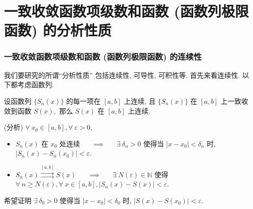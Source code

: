 
\section{一致收敛函数项级数和函数 (函数列极限函数) 的分析性质}


\begin{frame}
\frametitle{一致收敛函数项级数和函数 (函数列极限函数) 的连续性}

我们要研究的所谓``分析性质'' 包括连续性, 可导性, 可积性等. 首先来看连续性. 以下都考虑函数列.

\pause
\vspace{1em}

\begin{thm}[一致收敛函数列极限函数的连续性定理]
设函数列 $\{S_n(x)\}$ 的每一项在 $[a, b]$ 上连续, 且 $\{S_n(x)\}$ 在 $[a, b]$ 上一致收敛到函数 $S(x),$ 那么 $S(x)$ 在 $[a, b]$ 上连续.
\end{thm}

\pause
\vspace{0.5em}

\startproof[bg=yellow, fg=red](分析)
$\forall ~ x_0 \in [a, b], \forall ~ \varepsilon > 0,$
\begin{itemize}
\item $S_n(x)$ 在 $x_0$ 处连续 ~~ $\implies$ ~~ $\exists ~ \delta_n > 0$ 使得当 $|x - x_0| < \delta_n$ 时, $|S_n(x) - S_n(x_0)| < \varepsilon.$
\item $S_n(x) \stackrel{[a, b]}{\rightrightarrows} S(x)$ ~~ $\implies$ ~~ $\exists ~ N(\varepsilon) \in \mathbb{N}$ 使得 $\forall ~ n \geqslant N(\varepsilon), \forall ~ x \in [a, b], |S_n(x) - S(x)| < \varepsilon.$
\end{itemize}

\pause
\vspace{0.5em}

{\color{red}} 希望证明 $\exists ~ \delta_0 > 0$ 使得当 $|x - x_0| < \delta_0$ 时, $|S(x) - S(x_0)| < \varepsilon.$

\end{frame}


